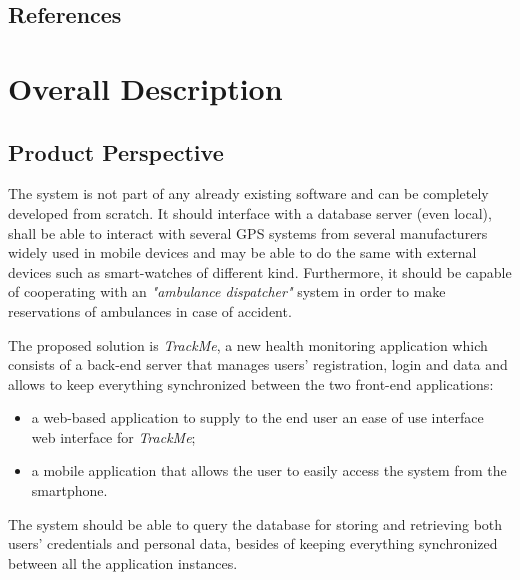\documentclass[a4paper]{article}
\begin{document}
    \subsection{References}
        \printbibliography[heading=none]
\newpage
\section{Overall Description}
    \subsection{Product Perspective}
    
    The system is not part of any already existing software and can be completely developed from scratch. It should interface with a database server (even local), shall be able to interact with several GPS systems from several manufacturers widely used in mobile devices and may be able to do the same with external devices such as smart-watches of different kind. Furthermore, it should be capable of cooperating with an \textit{"ambulance dispatcher"} system in order to make reservations of ambulances in case of accident.
    
    The proposed solution is \textit{TrackMe}, a new health monitoring application which consists of a back-end server that manages users' registration, login and data and allows to keep everything synchronized between the two front-end applications:
        \begin{itemize}
            \item a web-based application to supply to the end user an ease of use interface web interface for \textit{TrackMe};
            \item a mobile application that allows the user to easily access the system from the smartphone.
        \end{itemize}
    
    The system should be able to query the database for storing and retrieving both users' credentials and personal data, besides of keeping everything synchronized between all the application instances.
    
\end{document}
